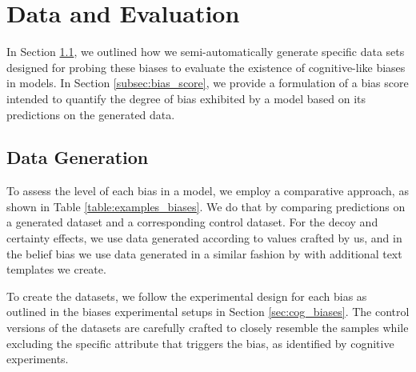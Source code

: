 \section{Data and Evaluation}

In Section \ref{subsec:data}, we outlined how we semi-automatically generate specific data sets designed for probing these biases to evaluate the existence of cognitive-like biases in models. 
In Section \ref{subsec:bias_score}, we provide a formulation of a bias score intended to quantify the degree of bias exhibited by a model based on its predictions on the generated data. %



\subsection{Data Generation} %
\label{subsec:data}
To assess the level of each bias in a model, we employ a comparative approach, as shown in Table \ref{table:examples_biases}.
We do that by
comparing predictions on a generated \biaseddataset{} dataset and a corresponding control dataset.
For the decoy and certainty effects, we use data generated according to values crafted by us, and in the belief bias we use data generated in a similar fashion by \citet{dasgupta2022language} with additional text templates we create. 

 To create the \biaseddataset{} 
datasets, we follow the experimental design for each bias as outlined in the biases experimental setups in Section \ref{sec:cog_biases}.
The control versions of the datasets are carefully crafted to closely resemble the \biaseddataset{} samples while excluding the specific attribute that triggers the bias, as identified by cognitive experiments.

